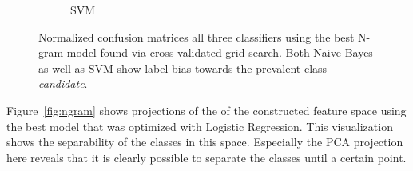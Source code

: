 \begin{figure}[h]
\begin{subfigure}[b]{0.32\textwidth}
        \caption{SVM}
\label{fig:ngram-conf-matrix-svm-normalized}
    \end{subfigure}
    \caption{Normalized confusion matrices all three classifiers using the best N-gram model found via cross-validated grid search. Both Naive Bayes as well as SVM show label bias towards the prevalent class \emph{candidate}.}
\label{fig:ngram-conf-matrix}
\end{figure}

Figure~\ref{fig:ngram} shows projections of the of the constructed feature space using the best model that was optimized with Logistic Regression. This visualization shows the separability of the classes in this space. Especially the PCA projection here reveals that it is clearly possible to separate the classes until a certain point.

